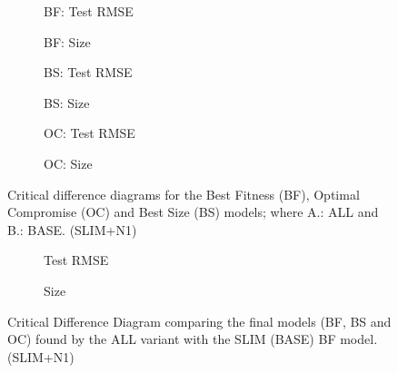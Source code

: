 \documentclass[11pt]{article}
\begin{document}
\begin{figure}[t]
\centering
\begin{subfigure}{0.48\textwidth}
\centering
\resizebox{\linewidth}{!}{}
\caption{BF: Test RMSE}
\end{subfigure}
\hfill
\begin{subfigure}{0.48\textwidth}
\centering
\resizebox{\linewidth}{!}{}
\caption{BF: Size}
\end{subfigure}
\vspace{1.5em}
\begin{subfigure}{0.48\textwidth}
\centering
\resizebox{\linewidth}{!}{}
\caption{BS: Test RMSE}
\end{subfigure}
\hfill
\begin{subfigure}{0.48\textwidth}
\centering
\resizebox{\linewidth}{!}{}
\caption{BS: Size}
\end{subfigure}
\vspace{1.5em}
\begin{subfigure}{0.48\textwidth}
\centering
\resizebox{\linewidth}{!}{}
\caption{OC: Test RMSE}
\end{subfigure}
\hfill
\begin{subfigure}{0.48\textwidth}
\centering
\resizebox{\linewidth}{!}{}
\caption{OC: Size}
\end{subfigure}
\caption{Critical difference diagrams for the Best Fitness (BF), Optimal Compromise (OC) and Best Size (BS) models; where A.: ALL and B.: BASE. (SLIM+N1)}
\end{figure}

\begin{figure}[t]
\centering
\begin{subfigure}{0.48\textwidth}
\centering
\resizebox{\linewidth}{!}{}
\caption{Test RMSE}
\end{subfigure}
\hfill
\begin{subfigure}{0.48\textwidth}
\centering
\resizebox{\linewidth}{!}{}
\caption{Size}
\end{subfigure}
\caption{Critical Difference Diagram comparing the final models (BF, BS and OC) found by the ALL variant with the SLIM (BASE) BF model. (SLIM+N1)}
\end{figure}
\end{document}
